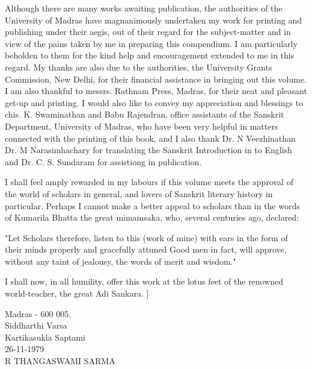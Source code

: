 Although there are many works awaiting publication, the authorities of the University of Madras have magnanimously undertaken my work for printing and publishing under their aegis, out of their regard for the subject-matter and in view of the pains taken by me in preparing this compendium. I am particularly beholden to them for the kind help and encouragement extended to me in this regard. My thanks are also due to the authorities, the University Grants Commission, New Delhi, for their financial assistance in bringing out this volume. I am also thankful to messrs. Rathnam Press, Madras, for their neat and pleasant get-up and printing. I would also like to convey my appreciation and blessings to chis. K. Swaminathan and Babu Rajendran, office assistants of the Sanskrit Department, University of Madras, who have been very helpful in matters connected with the printing of this book, and I also thank Dr. N Veezhinathan Dr. M Narasimhachary for translating the Sanskrit Introduction in to English and Dr. C. S. Sundaram for assistiong in publication. 

I shall feel amply rewarded in my labours if this volume meets the approval of the world of scholars in general, and lovers of Sanskrit literary history in particular. Perhaps I cannot make a better appeal to scholars than in the words of Kumarila Bhatta the great mimamsaka, who, several centuries ago, declared:

"Let Scholars therefore, listen to this (work of mine) with ears in the form of their minds properly and gracefully attuned Good men in fact, will approve, without any taint of jealousy, the words of merit and wisdom."

I shall now, in all humility, offer this work at the lotus feet of the renowned world-teacher, the great Adi Sankara. ]

Madras - 600 005.\\
Siddharthi Varsa\\
Kartikasukla Saptami\\
26-11-1979\\
R THANGASWAMI SARMA

